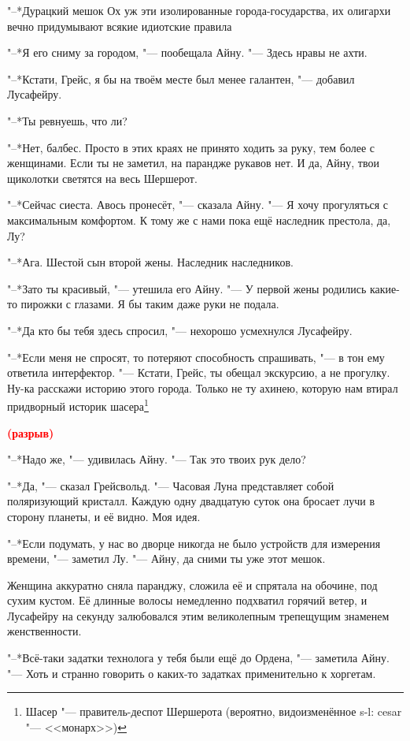 \documentclass[a4paper,10pt]{book}
\newcommand{\ldotst}{\so{...}\xspace}
\newcommand{\spacing}{\textcolor{red}{\textbf{(разрыв)}}}
\begin{document}
"--*Дурацкий мешок\ldotst Ох уж эти изолированные города-государства, их 
олигархи вечно придумывают всякие идиотские правила\ldotst

"--*Я его сниму за городом, "--- пообещала Айну. "--- Здесь нравы не ахти.

"--*Кстати, Грейс, я бы на твоём месте был менее галантен, "--- добавил 
Лусафейру.

"--*Ты ревнуешь, что ли?

"--*Нет, балбес. Просто в этих краях не принято ходить за руку, тем более с 
женщинами. Если ты не заметил, на парандже рукавов нет. И да, Айну, твои 
щиколотки светятся на весь Шершерот.

"--*Сейчас сиеста. Авось пронесёт, "--- сказала Айну. "--- Я хочу прогуляться с 
максимальным комфортом. К тому же с нами пока ещё наследник престола, да, Лу?

"--*Ага. Шестой сын второй жены. Наследник наследников.

"--*Зато ты красивый, "--- утешила его Айну. "--- У первой жены родились 
какие-то пирожки с глазами. Я бы таким даже руки не подала.

"--*Да кто бы тебя здесь спросил, "--- нехорошо усмехнулся Лусафейру.

"--*Если меня не спросят, то потеряют способность спрашивать, "--- в тон ему 
ответила интерфектор. "--- Кстати, Грейс, ты обещал экскурсию, а не прогулку. 
Ну-ка расскажи историю этого города. Только не ту ахинею, которую нам втирал 
придворный историк шасера\footnote{Шасер "--- правитель-деспот Шершерота 
(вероятно, видоизменённое s-l: cesar "--- <<монарх>>)}\ldotst

\spacing

"--*Надо же, "--- удивилась Айну. "--- Так это твоих рук дело?

"--*Да, "--- сказал Грейсвольд. "--- Часовая Луна представляет собой 
поляризующий кристалл. Каждую одну двадцатую суток она бросает лучи в сторону 
планеты, и её видно. Моя идея.

"--*Если подумать, у нас во дворце никогда не было устройств для измерения 
времени, "--- заметил Лу. "--- Айну, да сними ты уже этот мешок.

Женщина аккуратно сняла паранджу, сложила её и спрятала на обочине, под сухим 
кустом. Её длинные волосы немедленно подхватил горячий ветер, и Лусафейру на 
секунду залюбовался этим великолепным трепещущим знаменем женственности.

"--*Всё-таки задатки технолога у тебя были ещё до Ордена, "--- заметила Айну. 
"--- Хоть и странно говорить о каких-то задатках применительно к хоргетам.
\end{document}
